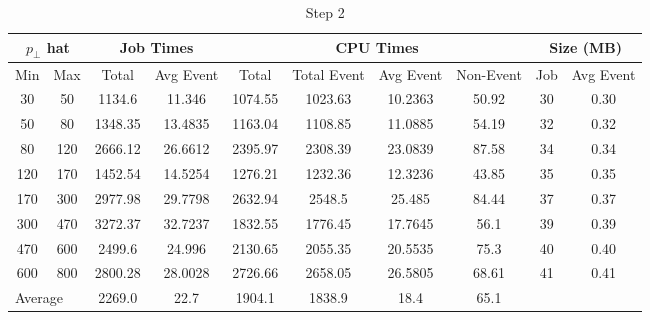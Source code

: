 \begin{table}[htp]
\centering

\begin{tabular}{|c|c||c|c||c|c|c|c||c|c|}
\hline
\multicolumn{2}{|c|}{$p_\perp$ hat} & \multicolumn{2}{|c||}{Job Times} & \multicolumn{4}{c||}{CPU Times} & \multicolumn{2}{c|}{Size (MB)} \\
\hline
Min & Max & Total & Avg Event & Total & Total Event & Avg Event & Non-Event   & Job & Avg Event \\
\hline
\hline
 30 &  50 & 1134.6  & 11.346  & 1074.55 & 1023.63 & 10.2363 & 50.92 & 30 & 0.30 \\
 50 &  80 & 1348.35 & 13.4835 & 1163.04 & 1108.85 & 11.0885 & 54.19 & 32 & 0.32 \\
 80 & 120 & 2666.12 & 26.6612 & 2395.97 & 2308.39 & 23.0839 & 87.58 & 34 & 0.34 \\
120 & 170 & 1452.54 & 14.5254 & 1276.21 & 1232.36 & 12.3236 & 43.85 & 35 & 0.35 \\
170 & 300 & 2977.98 & 29.7798 & 2632.94 & 2548.5  & 25.485  & 84.44 & 37 & 0.37 \\
300 & 470 & 3272.37 & 32.7237 & 1832.55 & 1776.45 & 17.7645 & 56.1  & 39 & 0.39 \\
470 & 600 & 2499.6  & 24.996  & 2130.65 & 2055.35 & 20.5535 & 75.3  & 40 & 0.40 \\
600 & 800 & 2800.28 & 28.0028 & 2726.66 & 2658.05 & 26.5805 & 68.61 & 41 & 0.41 \\
\hline
\hline
\multicolumn{2}{|l|}{Average} & 2269.0 & 22.7 & 1904.1 & 1838.9 & 18.4 & 65.1 &  &  \\
\hline
\end{tabular}

\caption{Step 2}
\label{table_QCD_ProdUnfiltered_Step2}
\end{table}
